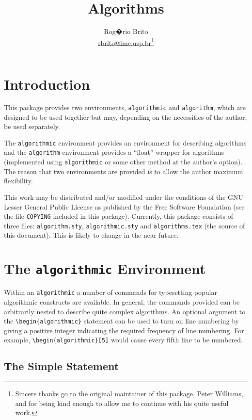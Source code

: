 \documentclass[letterpaper]{article}
\title{Algorithms}
\author{Rog�rio Brito\\
  \href{mailto:rbrito@ime.usp.br}{rbrito@ime.usp.br}\thanks{Sincere thanks
    go to the original maintainer of this package, Peter Williams, and for
    being kind enough to allow me to continue with his quite useful work.}}
\newcommand{\keyword}[1]{\texttt{#1}}
\newcommand{\filename}[1]{\texttt{#1}}
\begin{document}
\maketitle
\tableofcontents

\section{Introduction}

This package provides two environments, \keyword{algorithmic} and
\keyword{algorithm}, which are designed to be used together but may,
depending on the necessities of the author, be used separately.

The \keyword{algorithmic} environment provides an environment for
describing algorithms and the \keyword{algorithm} environment provides a
``float'' wrapper for algorithms (implemented using
\keyword{algorithmic} or some other method at the author's option).  The
reason that two environments are provided is to allow the author maximum
flexibility.

This work may be distributed and/or modified under the conditions of the
GNU Lesser General Public License as published by the Free Software
Foundation (see the file \filename{COPYING} included in this package).
Currently, this package consists of three files:
\filename{algorithm.sty}, \filename{algorithmic.sty} and
\filename{algorithms.tex} (the source of this document). This is likely
to change in the near future.

\section[Environment: \keyword{algorithmic}]%
{The \keyword{algorithmic} Environment}
\label{sec:algorithmic-envir}
Within an \keyword{algorithmic} a number of commands for typesetting
popular algorithmic constructs are available.  In general, the commands
provided can be arbitrarily nested to describe quite complex algorithms.
An optional argument to the \verb+\begin{algorithmic}+ statement can be
  used to turn on line numbering by giving a positive integer indicating
  the required frequency of line numbering.  For example,
  \verb+\begin{algorithmic}[5]+ would cause every fifth line to be
    numbered.

\subsection{The Simple Statement}
\end{document}
